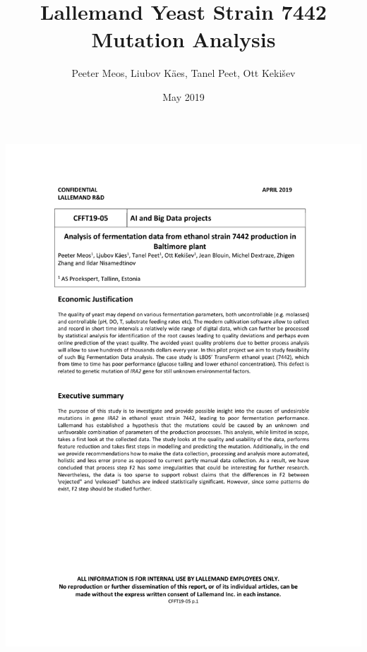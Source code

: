 \documentclass{article}
\title{Lallemand Yeast Strain 7442 Mutation Analysis}
\author{Peeter Meos, Liubov K\"aes, Tanel Peet, Ott Keki{\v s}ev}
\affil{Proekspert AS}
\date{May 2019}
\begin{document}

\includegraphics[width=1\paperwidth]{title_page.pdf}

\restoregeometry


            
\end{document}
